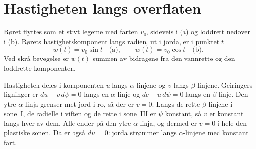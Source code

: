 \documentclass[11pt,a4paper]{article}
\begin{document}
\section{Hastigheten langs overflaten}
\label{sec:velocity}

Røret flyttes som et stivt legeme med farten $v_0$, sideveis i (a) og
loddrett nedover i (b).  Rørets hastighetskomponent langs radien, ut i
jorda, er i punktet $t$
\begin{equation}
  w(t) = v_0 \sin t \quad\text{(a)}, \qquad w(t) = v_0 \cos t \quad\text{(b)} .
\end{equation}
Ved skrå bevegelse er $w(t)$ summen av bidragene fra den vannrette og den
loddrette komponenten.

Hastigheten deles i komponenten $u$ langs $\alpha$-linjene og $v$ langs
$\beta$-linjene.  Geiringers ligninger er $du - v\,d\psi = 0$ langs en
$\alpha$-linje og $dv + u\,d\psi = 0$ langs en $\beta$-linje.  Den ytre
$\alpha$-linja grenser mot jord i ro, så der er $v = 0$.  Langs de rette
$\beta$-linjene i sone~I, de radielle i viften og de rette i sone~III er
$\psi$ konstant, så $v$ er konstant langs hver av dem.  Alle ender på den
ytre $\alpha$-linja, og dermed er $v = 0$ i hele den plastiske sonen.  Da er
også $du = 0$: jorda strømmer langs $\alpha$-linjene med konstant fart.
\end{document}
